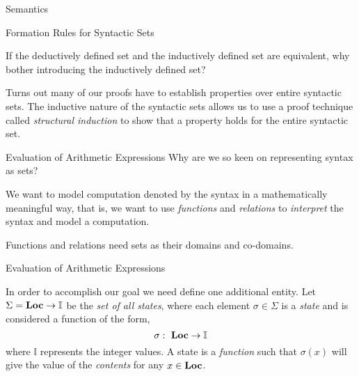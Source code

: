 \documentclass{beamer}
\begin{document}
\begin{frame}{Semantics}

\begin{frame}{Formation Rules for Syntactic Sets}

If the deductively defined set and the inductively defined set are equivalent, why bother introducing the inductively defined set?

\vspace{.2in}

Turns out many of our proofs have to establish properties over entire syntactic sets.  The inductive nature of the syntactic sets allows us to use a
proof technique called {\em structural induction} to show that a property holds for the entire syntactic set.

\end{frame}


\begin{frame}{\large Evaluation of Arithmetic Expressions}
Why are we so keen on representing syntax as sets?

\vspace{.1in}

We want to model computation denoted by the syntax in a mathematically meaningful
way, that is, we want to use {\em functions} and {\em relations} to {\em interpret} the syntax and model a computation.

\vspace{.1in}

Functions and relations need sets as their domains and co-domains.

\end{frame}


\begin{frame}{\large Evaluation of Arithmetic Expressions}

In order to accomplish our goal we need define one additional entity.  Let $\Sigma = \mbox{\bf Loc} \rightarrow \mathbb{I}$  be the {\em set of all states}, where each element $\sigma \in \Sigma$ is a {\em state} and is considered
a function of the form,
\[
\sigma\,\colon\; \mbox{\bf Loc} \rightarrow \mathbb{I}
\]
where $\mathbb{I}$ represents the integer values.
A state is a {\em function} such that $\sigma(x)$ will give the value of the {\em contents}
for any $x \in \mbox{\bf Loc}$.


\end{frame}
\end{frame}
\end{document}
